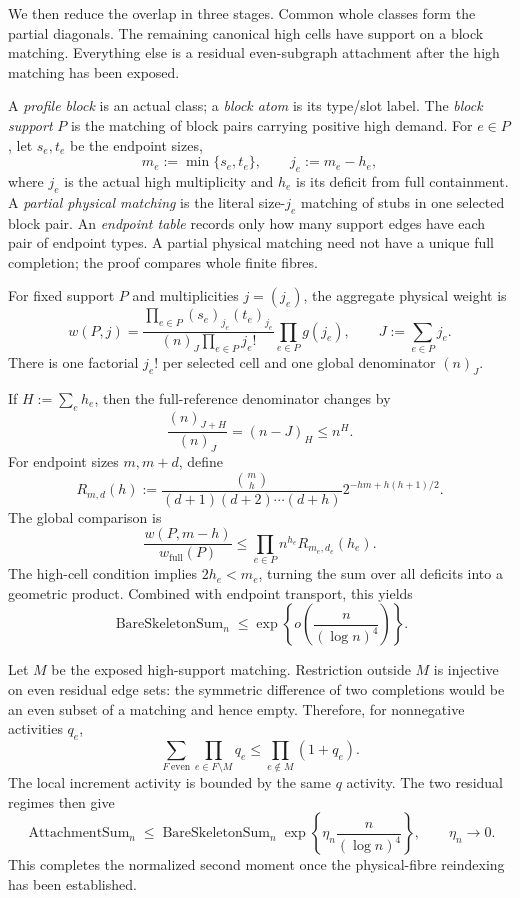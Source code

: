 We then reduce the overlap in three stages.  Common whole classes form the
partial diagonals.  The remaining canonical high cells have support on a block
matching.  Everything else is a residual even-subgraph attachment after the
high matching has been exposed.

A \emph{profile block} is an actual class; a \emph{block atom} is its type/slot
label.  The \emph{block support} $P$ is the matching of block pairs carrying
positive high demand.  For $e\in P$, let $s_e,t_e$ be the endpoint sizes,
\[
  m_e:=\min\{s_e,t_e\},
  \qquad
  j_e:=m_e-h_e,
\]
where $j_e$ is the actual high multiplicity and $h_e$ is its deficit from full
containment.  A \emph{partial physical matching} is the literal size-$j_e$
matching of stubs in one selected block pair.  An \emph{endpoint table} records
only how many support edges have each pair of endpoint types.  A partial
physical matching need not have a unique full completion; the proof compares
whole finite fibres.

For fixed support $P$ and multiplicities $j=(j_e)$, the aggregate physical
weight is
\[
  w(P,j)
  =
  \frac{\displaystyle
    \prod_{e\in P}(s_e)_{j_e}(t_e)_{j_e}}
  {\displaystyle
    (n)_J\prod_{e\in P}j_e!}
  \prod_{e\in P}g(j_e),
  \qquad
  J:=\sum_{e\in P}j_e.
\]
There is one factorial $j_e!$ per selected cell and one global denominator
$(n)_J$.

If $H:=\sum_e h_e$, then the full-reference denominator changes by
\[
  \frac{(n)_{J+H}}{(n)_J}=(n-J)_H\le n^H.
\]
For endpoint sizes $m,m+d$, define
\[
  R_{m,d}(h)
  :=
  \frac{\binom mh}{(d+1)(d+2)\cdots(d+h)}
  2^{-hm+h(h+1)/2}.
\]
The global comparison is
\[
  \frac{w(P,m-h)}{w_{\mathrm{full}}(P)}
  \le
  \prod_{e\in P}n^{h_e}R_{m_e,d_e}(h_e).
\]
The high-cell condition implies $2h_e<m_e$, turning the sum over all deficits
into a geometric product.  Combined with endpoint transport, this yields
\[
  \operatorname{BareSkeletonSum}_n
  \le
  \exp\!\left\{
    o\!\left(\frac{n}{(\log n)^4}\right)
  \right\}.
\]

Let $M$ be the exposed high-support matching.  Restriction outside $M$ is
injective on even residual edge sets: the symmetric difference of two
completions would be an even subset of a matching and hence empty.  Therefore,
for nonnegative activities $q_e$,
\[
  \sum_{F\ \mathrm{even}}
    \prod_{e\in F\setminus M}q_e
  \le
  \prod_{e\notin M}(1+q_e).
\]
The local increment activity is bounded by the same $q$ activity.  The two
residual regimes then give
\[
  \operatorname{AttachmentSum}_n
  \le
  \operatorname{BareSkeletonSum}_n
  \exp\!\left\{
    \eta_n\frac{n}{(\log n)^4}
  \right\},
  \qquad \eta_n\to0.
\]
This completes the normalized second moment once the physical-fibre reindexing
has been established.

